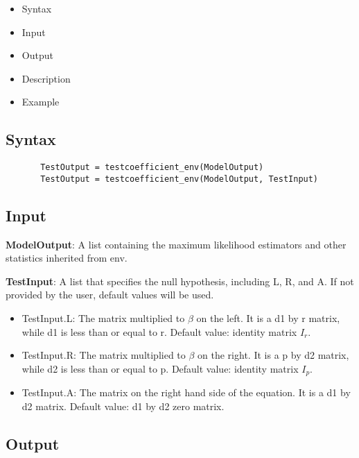 \documentclass[a4paper,11pt,openany]{memoir}
\begin{document}
\begin{itemize}
\setlength{\itemsep}{-1ex}
   \item Syntax
   \item Input
   \item Output
   \item Description
   \item Example
\end{itemize}


\subsection*{Syntax}


\begin{verbatim}       TestOutput = testcoefficient_env(ModelOutput)
       TestOutput = testcoefficient_env(ModelOutput, TestInput)\end{verbatim}
    

\subsection*{Input}

\begin{par}
\textbf{ModelOutput}: A list containing the maximum likelihood estimators and other statistics inherited from env.
\end{par} \vspace{1em}
\begin{par}
\textbf{TestInput}: A list that specifies the null hypothesis, including L, R, and A.  If not provided by the user, default values will be used.
\end{par} \vspace{1em}
\begin{itemize}
\setlength{\itemsep}{-1ex}
   \item TestInput.L: The matrix multiplied to $\beta$ on the left.  It is a d1 by r matrix, while d1 is less than or equal to r.  Default value: identity matrix $I_r$.
   \item TestInput.R: The matrix multiplied to $\beta$ on the right.  It is a p by d2 matrix, while d2 is less than or equal to p.  Default value: identity matrix $I_p$.
   \item TestInput.A: The matrix on the right hand side of the equation.  It is a d1 by d2 matrix.  Default value: d1 by d2 zero matrix.
\end{itemize}


\subsection*{Output}
\end{document}
